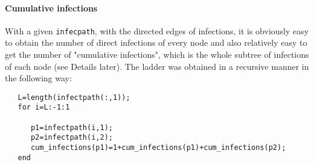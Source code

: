 \paragraph{Cumulative infections}

With a given \texttt{infecpath}, with the directed edges of infections, it is obviously easy to obtain the number of direct infections of every node and also relatively easy to get the number of "cumulative infections", which is the whole subtree of infections of each node (see Details later). The ladder was obtained in a recursive manner in the following way:

\begin{lstlisting} 
   L=length(infectpath(:,1));
   for i=L:-1:1
      
      p1=infectpath(i,1);
      p2=infectpath(i,2);
      cum_infections(p1)=1+cum_infections(p1)+cum_infections(p2);
   end

\end{lstlisting}

